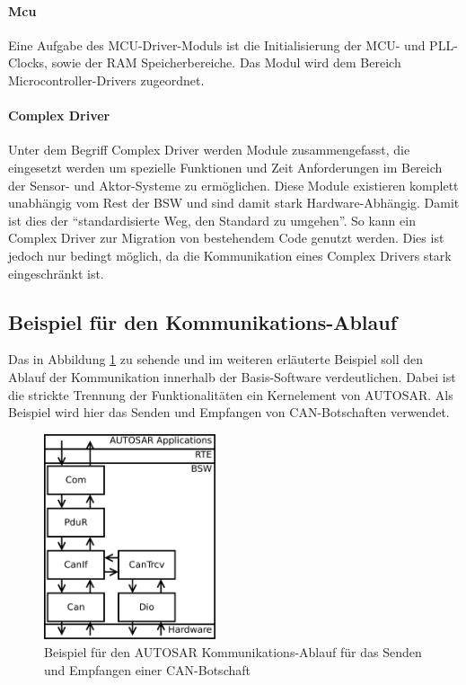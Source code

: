 \documentclass[
  a4paper,					    %
  twoside,
  DIV=calc,     				%
  bibliography=totoc,
  cleardoublepage=empty,
  ngerman,     					%
  final       					%
]{scrbook}
\begin{document}
\paragraph{Mcu}
Eine Aufgabe des MCU-Driver-Moduls ist die Initialisierung der MCU- und PLL-Clocks, sowie der RAM Speicherbereiche. Das Modul wird dem Bereich Microcontroller-Drivers zugeordnet.

\paragraph{Complex Driver}
Unter dem Begriff Complex Driver werden Module zusammengefasst, die eingesetzt werden um spezielle Funktionen und Zeit Anforderungen im Bereich der Sensor- und Aktor-Systeme zu ermöglichen. Diese Module existieren komplett unabhängig vom Rest der BSW und sind damit stark Hardware-Abhängig. Damit ist dies der "`standardisierte Weg, den Standard zu umgehen"'\cite[Seite 227]{SE_Autosar}. So kann ein Complex Driver zur Migration von bestehendem Code genutzt werden. Dies ist jedoch nur bedingt möglich, da die Kommunikation eines Complex Drivers stark eingeschränkt ist.


\subsection{Beispiel für den Kommunikations-Ablauf}
\label{sec:beispiel_komm}
Das in Abbildung \ref{fig:komm_beispiel} zu sehende und im weiteren erläuterte Beispiel soll den Ablauf der Kommunikation innerhalb der Basis-Software verdeutlichen. Dabei ist die strickte Trennung der Funktionalitäten ein Kernelement von AUTOSAR. Als Beispiel wird hier das Senden und Empfangen von CAN-Botschaften verwendet.

\begin{figure}[ht]
    \centering
    \includegraphics[width=0.45\textwidth]{komm_beispiel}
    \caption[Beispiel für den AUTOSAR Kommunikations-Ablauf]{Beispiel für den AUTOSAR Kommunikations-Ablauf für das Senden und Empfangen einer CAN-Botschaft}
    \label{fig:komm_beispiel}
\end{figure}
\end{document}
